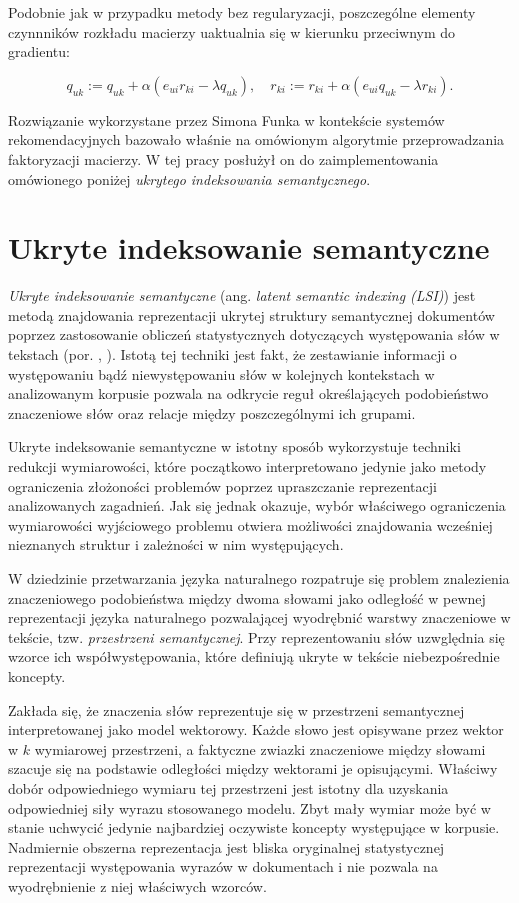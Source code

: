 \documentclass{pracamgr}
\begin{document}
Podobnie jak w przypadku metody bez regularyzacji, poszczególne elementy czynnników rozkładu macierzy uaktualnia się w kierunku przeciwnym do gradientu:

\[
q_{uk} := q_{uk} + \alpha (e_{ui} r_{ki} - \lambda q_{uk}), \quad
r_{ki} := r_{ki} + \alpha (e_{ui} q_{uk} - \lambda r_{ki}).
\]

Rozwiązanie wykorzystane przez Simona Funka \cite{funk} w kontekście systemów rekomendacyjnych bazowało właśnie na omówionym algorytmie przeprowadzania faktoryzacji macierzy. W tej pracy posłużył on do zaimplementowania omówionego poniżej \textit{ukrytego indeksowania semantycznego}.

\section{Ukryte indeksowanie semantyczne}
\textit{Ukryte indeksowanie semantyczne} (ang. \textit{latent semantic indexing (LSI)}) jest metodą znajdowania reprezentacji ukrytej struktury semantycznej dokumentów poprzez zastosowanie obliczeń statystycznych dotyczących występowania słów w tekstach (por. \cite{landauer}, \cite{landauer2}). Istotą tej techniki jest fakt, że zestawianie informacji o występowaniu bądź niewystępowaniu słów w kolejnych kontekstach w analizowanym korpusie pozwala na odkrycie reguł określających podobieństwo znaczeniowe słów oraz relacje między poszczególnymi ich grupami. 

Ukryte indeksowanie semantyczne w istotny sposób wykorzystuje techniki redukcji wymiarowości, które początkowo interpretowano jedynie jako metody ograniczenia złożoności problemów poprzez upraszczanie reprezentacji analizowanych zagadnień. Jak się jednak okazuje, wybór właściwego ograniczenia wymiarowości wyjściowego problemu otwiera możliwości znajdowania wcześniej nieznanych struktur i zależności w nim występujących. 

W dziedzinie przetwarzania języka naturalnego rozpatruje się problem znalezienia znaczeniowego podobieństwa między dwoma słowami jako odległość w pewnej reprezentacji języka naturalnego pozwalającej wyodrębnić warstwy znaczeniowe w tekście, tzw. \textit{przestrzeni semantycznej}. Przy reprezentowaniu słów uzwględnia się wzorce ich współwystępowania, które definiują ukryte w tekście niebezpośrednie koncepty.

Zakłada się, że znaczenia słów reprezentuje się w przestrzeni semantycznej interpretowanej jako model wektorowy. Każde słowo jest opisywane przez wektor w $k$ wymiarowej przestrzeni, a faktyczne zwiazki znaczeniowe między słowami szacuje się na podstawie odległości między wektorami je opisującymi. Właściwy dobór odpowiedniego wymiaru tej przestrzeni jest istotny dla uzyskania odpowiedniej siły wyrazu stosowanego modelu. Zbyt mały wymiar może być w stanie uchwycić jedynie najbardziej oczywiste koncepty występujące w korpusie. Nadmiernie obszerna reprezentacja jest bliska oryginalnej statystycznej reprezentacji występowania wyrazów w dokumentach i nie pozwala na wyodrębnienie z niej właściwych wzorców.
\end{document}
